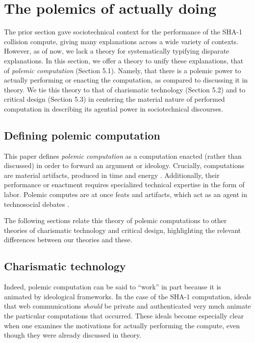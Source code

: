\documentclass[sigconf]{acmart}
\begin{document}
\section{The polemics of actually doing}
\label{sec:orge0fa1f8}

The prior section gave sociotechnical context for the performance of the SHA-1 collision compute,
giving many explanations across a wide variety of contexts.
However, as of now, we lack a theory for systematically typifying disparate explanations.
In this section, we offer a theory to unify these explanations, that of \emph{polemic computation} (Section 5.1).
Namely, that there is a polemic power to actually performing or enacting the computation,
as compared to discussing it in theory.
We tie this theory to that of charismatic technology (Section 5.2)
and to critical design (Section 5.3)
in centering the material nature of performed computation
in describing its agential power in sociotechnical discourses.

\subsection{Defining polemic computation}
\label{sec:org3e02dd8}

This paper defines \emph{polemic computation} 
as a computation enacted (rather than discussed)
in order to forward an argument or ideology.
Crucially, computations are material artifacts, 
produced in time and energy 
\cite{Dourish2011a}.
Additionally,
their performance or enactment requires 
specialized technical expertise in the form of labor.
Polemic computes are at once feats and artifacts, which act
as an agent in technosocial debates \cite{Ames2015}.

The following sections relate this theory of polemic computations
to other theories of charismatic technology and critical design,
highlighting the relevant differences between our theories and these. 

\subsection{Charismatic technology}
\label{sec:org9a75340}

Indeed, polemic computation can be said to ``work'' in part 
because it is animated by ideological frameworks.
In the case of the SHA-1 computation,
ideals that web communications \emph{should} be private and authenticated
very much animate the particular computations that occurred.
These ideals become especially clear when one examines the motivations for actually performing the compute,
even though they were already discussed in theory.
\end{document}
